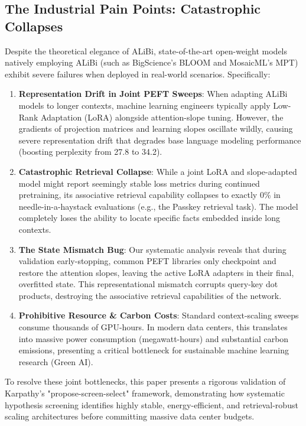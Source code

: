 \documentclass[11pt,journal,compsoc]{IEEEtran}
\begin{document}
\subsection{The Industrial Pain Points: Catastrophic Collapses}
Despite the theoretical elegance of ALiBi, state-of-the-art open-weight models natively employing ALiBi (such as BigScience's BLOOM and MosaicML's MPT) exhibit severe failures when deployed in real-world scenarios. Specifically:
\begin{enumerate}
    \item \textbf{Representation Drift in Joint PEFT Sweeps}: When adapting ALiBi models to longer contexts, machine learning engineers typically apply Low-Rank Adaptation (LoRA) alongside attention-slope tuning. However, the gradients of projection matrices and learning slopes oscillate wildly, causing severe representation drift that degrades base language modeling performance (boosting perplexity from 27.8 to 34.2).
    \item \textbf{Catastrophic Retrieval Collapse}: While a joint LoRA and slope-adapted model might report seemingly stable loss metrics during continued pretraining, its associative retrieval capability collapses to exactly 0\% in needle-in-a-haystack evaluations (e.g., the Passkey retrieval task). The model completely loses the ability to locate specific facts embedded inside long contexts.
    \item \textbf{The State Mismatch Bug}: Our systematic analysis reveals that during validation early-stopping, common PEFT libraries only checkpoint and restore the attention slopes, leaving the active LoRA adapters in their final, overfitted state. This representational mismatch corrupts query-key dot products, destroying the associative retrieval capabilities of the network.
    \item \textbf{Prohibitive Resource \& Carbon Costs}: Standard context-scaling sweeps consume thousands of GPU-hours. In modern data centers, this translates into massive power consumption (megawatt-hours) and substantial carbon emissions, presenting a critical bottleneck for sustainable machine learning research (Green AI).
\end{enumerate}

To resolve these joint bottlenecks, this paper presents a rigorous validation of Karpathy's "propose-screen-select" framework, demonstrating how systematic hypothesis screening identifies highly stable, energy-efficient, and retrieval-robust scaling architectures before committing massive data center budgets.
\end{document}
